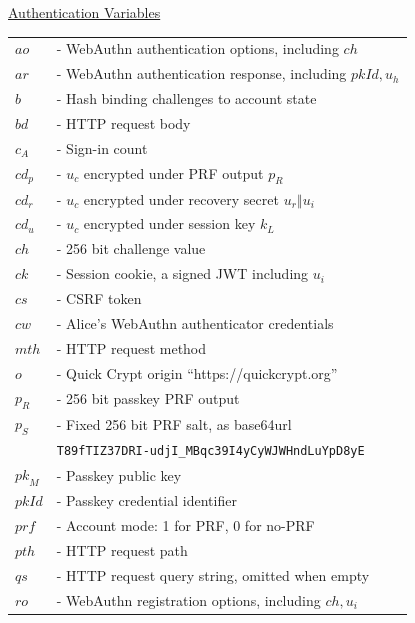 \documentclass{article}
\newlength{\stanzagap}
\newlength{\stanzawidth}
\newlength{\stanzabox}
\newenvironment{stanza}[1][\stanzawidth]
  {\par\addvspace{\stanzagap}%
   \setlength{\stanzabox}{\dimexpr\linewidth-\parindent\relax}%
   \ifdim\stanzabox>#1\setlength{\stanzabox}{#1}\fi
   \noindent\hspace*{\parindent}\begin{minipage}{\stanzabox}}
  {\end{minipage}\par\addvspace{\stanzagap}}
\begin{document}
\begin{stanza}
\underline{Authentication Variables}\\

\begin{tabular}{@{}p{5mm} l}
$\mathit{ao}$ & \textrm{ - WebAuthn authentication options, including }$\mathit{ch}$\\
$\mathit{ar}$ & \textrm{ - WebAuthn authentication response, including }$\mathit{pkId}, u_h$\\
$b$ & \textrm{ - Hash binding challenges to account state}\\
$\mathit{bd}$ & \textrm{ - HTTP request body} \\
$c_A$ & \textrm{ - Sign-in count} \\
$\mathit{cd}_p$ & \textrm{ - }$u_c$\textrm{ encrypted under PRF output }$p_R$\\
$\mathit{cd}_r$ & \textrm{ - }$u_c$\textrm{ encrypted under recovery secret }$u_r \mathbin\Vert u_i$\\
$\mathit{cd}_u$ & \textrm{ - }$u_c$\textrm{ encrypted under session key }$k_L$\\
$\mathit{ch}$ & \textrm{ - 256 bit challenge value} \\
$\mathit{ck}$ & \textrm{ - Session cookie, a signed JWT including }$u_i$\\
$\mathit{cs}$ & \textrm{ - CSRF token} \\
$\mathit{cw}$ & \textrm{ - Alice's WebAuthn authenticator credentials} \\
$\mathit{mth}$ & \textrm{ - HTTP request method} \\
$o$ & \textrm{ - Quick Crypt origin ``https://quickcrypt.org''} \\
$p_R$ & \textrm{ - 256 bit passkey PRF output } \\
$p_S$ & \textrm{ - Fixed 256 bit PRF salt, as base64url } \\
& \phantom{\textrm{ - }}\texttt{T89fTIZ37DRI-udjI\_MBqc39I4yCyWJWHndLuYpD8yE} \\
$\mathit{pk}_M$ & \textrm{ - Passkey public key} \\
$\mathit{pkId}$ & \textrm{ - Passkey credential identifier} \\
$\mathit{prf}$ & \textrm{ - Account mode: 1 for PRF, 0 for no-PRF} \\
$\mathit{pth}$ & \textrm{ - HTTP request path} \\
$\mathit{qs}$ & \textrm{ - HTTP request query string, omitted when empty} \\
$\mathit{ro}$ & \textrm{ - WebAuthn registration options, including }$\mathit{ch}, u_i$\\

\end{tabular}
\end{stanza}
\end{document}
